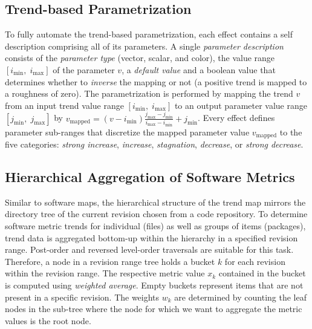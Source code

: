 \subsection{Trend-based Parametrization}
\noindent
To fully automate the trend-based parametrization, each effect contains a self description comprising all of its parameters. 
A single \emph{parameter description} consists of the \emph{parameter type} (\ie vector, scalar, and color), the value range $[i_{\mathrm{min}},\;i_{\mathrm{max}}]$ of the parameter $v$, a \emph{default value} and a boolean value that determines whether to \emph{inverse} the mapping or not (\eg a positive trend is mapped to a roughness of zero).
The parametrization is performed by mapping the trend $v$ from an input trend value range $[i_{\mathrm{min}},\; i_{\mathrm{max}}]$ to an output parameter value range $[j_{\mathrm{min}},\;j_{\mathrm{max}}]$ by 
$  v_{\mathrm{mapped}} = (v - i_{\mathrm{min}})\frac{j_{\mathrm{max}} - j_{\mathrm{min}}}{i_{\mathrm{max}} - i_{\mathrm{min}}} + j_{\mathrm{min}}$.
Every effect defines parameter sub-ranges that discretize the mapped parameter value $v_{\mathrm{mapped}}$ to the five categories: \emph{strong increase}, \emph{increase}, \emph{stagnation}, \emph{decrease}, or \emph{strong decrease}.

\subsection{Hierarchical Aggregation of Software Metrics}
\noindent
Similar to software maps, the hierarchical structure of the trend map mirrors the directory tree of the current revision chosen from a code repository. 
To determine software metric trends for individual (\ie files) as well as groups of items (\eg packages), trend data is aggregated bottom-up within the hierarchy in a specified revision range.
Post-order and reversed level-order traversals are suitable for this task. 
Therefore, a node in a revision range tree holds a bucket $k$ for each revision within the revision range. 
The respective metric value  $x_k$ contained in the bucket is computed using \emph{weighted average}.
Empty buckets represent items that are not present in a specific revision. 
The weights $w_k$ are determined by counting the leaf nodes in the sub-tree where the node for which we want to aggregate the metric values is the root node.
